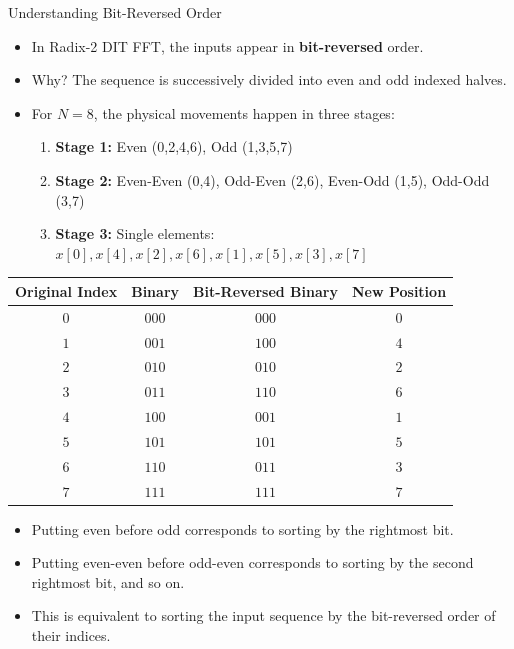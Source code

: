 \begin{frame}{Understanding Bit-Reversed Order}
    \begin{itemize}
        \item In Radix-2 DIT FFT, the inputs appear in \textbf{bit-reversed} order.
        \item Why? The sequence is successively divided into even and odd indexed halves.
        \item For $N=8$, the physical movements happen in three stages:
              \begin{enumerate}
                  \item \textbf{Stage 1:} Even (0,2,4,6), Odd (1,3,5,7)
                  \item \textbf{Stage 2:} Even-Even (0,4), Odd-Even (2,6), Even-Odd (1,5), Odd-Odd (3,7)
                  \item \textbf{Stage 3:} Single elements: $x[0], x[4], x[2], x[6], x[1], x[5], x[3], x[7]$
              \end{enumerate}
    \end{itemize}
    \begin{center}
        \scriptsize
        \begin{tabular}{cccc}
            \toprule
            Original Index & Binary & Bit-Reversed Binary & New Position \\
            \midrule
            $0$            & $000$  & $000$               & $0$          \\
            $1$            & $001$  & $100$               & $4$          \\
            $2$            & $010$  & $010$               & $2$          \\
            $3$            & $011$  & $110$               & $6$          \\
            $4$            & $100$  & $001$               & $1$          \\
            $5$            & $101$  & $101$               & $5$          \\
            $6$            & $110$  & $011$               & $3$          \\
            $7$            & $111$  & $111$               & $7$          \\
            \bottomrule
        \end{tabular}
    \end{center}
    \begin{itemize}
        \item Putting even before odd corresponds to sorting by the rightmost bit.
        \item Putting even-even before odd-even corresponds to sorting by the second rightmost bit, and so on.
        \item This is equivalent to sorting the input sequence by the bit-reversed order of their indices.
    \end{itemize}
\end{frame}

